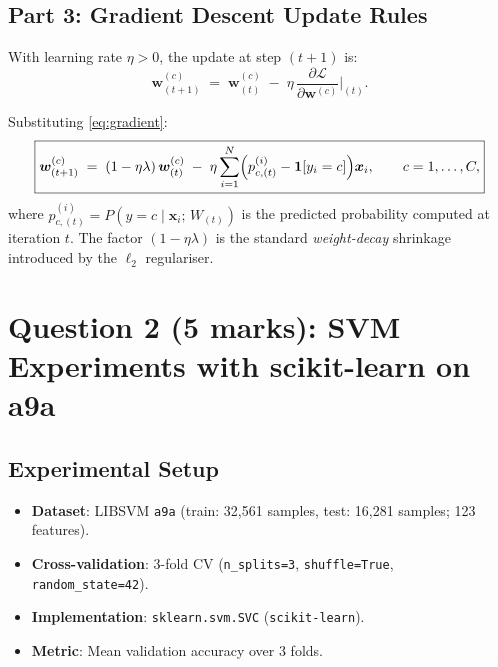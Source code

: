 \documentclass[12pt,a4paper]{article}
\newcommand{\bx}{\bm{x}}
\newcommand{\bw}{\bm{w}}
\newcommand{\ind}[1]{\boldsymbol{1}\!\left[#1\right]}
\begin{document}
\subsection{Part 3: Gradient Descent Update Rules}

With learning rate $\eta > 0$, the update at step $(t+1)$ is:
\begin{equation}
  \bw^{(c)}_{(t+1)}
  \;=\;
  \bw^{(c)}_{(t)}
  \;-\;
  \eta\,\frac{\partial \mathcal{L}}{\partial \bw^{(c)}}\Bigg|_{(t)}.
\end{equation}

Substituting \eqref{eq:gradient}:
\begin{equation}
  \boxed{
  \bw^{(c)}_{(t+1)}
  \;=\;
  (1 - \eta\lambda)\,\bw^{(c)}_{(t)}
  \;-\;
  \eta\sum_{i=1}^{N}
     \Bigl(p_{c,{(t)}}^{(i)} - \ind{y_i = c}\Bigr)\bx_i,
  \qquad c = 1, \ldots, C,
  }
  \label{eq:update}
\end{equation}
where $p_{c,(t)}^{(i)} = P(y=c \mid \bx_i;\, W_{(t)})$ is the predicted
probability computed at iteration $t$.
The factor $(1-\eta\lambda)$ is the standard \emph{weight-decay} shrinkage
introduced by the $\ell_2$ regulariser.

\newpage
\section{Question 2 (5 marks): SVM Experiments with scikit-learn on a9a}

\subsection*{Experimental Setup}

\begin{itemize}[leftmargin=*]
  \item \textbf{Dataset}: LIBSVM \texttt{a9a}
        (train: 32,561 samples, test: 16,281 samples; 123 features).
  \item \textbf{Cross-validation}: 3-fold CV
        (\texttt{n\_splits=3}, \texttt{shuffle=True}, \texttt{random\_state=42}).
  \item \textbf{Implementation}: \texttt{sklearn.svm.SVC} (\texttt{scikit-learn}).
  \item \textbf{Metric}: Mean validation accuracy over 3 folds.
\end{itemize}
\end{document}
